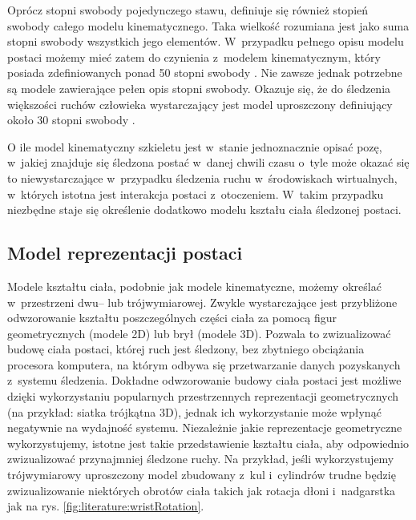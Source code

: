 Oprócz stopni swobody pojedynczego stawu, definiuje się również stopień swobody całego modelu kinematycznego. Taka wielkość rozumiana jest jako suma stopni swobody wszystkich jego elementów. W~przypadku pełnego opisu modelu postaci możemy mieć zatem do czynienia z~modelem kinematycznym, który posiada zdefiniowanych ponad 50 stopni swobody \cite{Agarwal2006}. Nie zawsze jednak potrzebne są modele zawierające pełen opis stopni swobody. Okazuje się, że do śledzenia większości ruchów człowieka wystarczający jest model uproszczony definiujący około 30 stopni swobody \cite{Sigal2006,Kwolek2011}.
													
O ile model kinematyczny szkieletu jest w~stanie jednoznacznie opisać pozę, w~jakiej znajduje się śledzona postać w~danej chwili czasu o~tyle może okazać się to niewystarczające w~przypadku śledzenia ruchu w~środowiskach wirtualnych, w~których istotna jest interakcja postaci z~otoczeniem. W~takim przypadku niezbędne staje się określenie dodatkowo modelu kształu ciała śledzonej postaci.
															
\subsection{Model reprezentacji postaci}
Modele kształtu ciała, podobnie jak modele kinematyczne, możemy określać w~przestrzeni dwu-- lub trójwymiarowej. Zwykle wystarczające jest przybliżone odwzorowanie kształtu poszczególnych części ciała za pomocą figur geometrycznych (modele 2D) lub brył (modele 3D). Pozwala to zwizualizować budowę ciała postaci, której ruch jest śledzony, bez zbytniego obciążania procesora komputera, na którym odbywa się przetwarzanie danych pozyskanych z~systemu śledzenia. Dokładne odwzorowanie budowy ciała postaci jest możliwe dzięki wykorzystaniu popularnych przestrzennych reprezentacji geometrycznych (na przykład: siatka trójkątna 3D), jednak ich wykorzystanie może wpłynąć negatywnie na wydajność systemu. 
Niezależnie jakie reprezentacje geometryczne wykorzystujemy, istotne jest takie przedstawienie kształtu ciała, aby odpowiednio zwizualizować przynajmniej śledzone ruchy. Na przykład, jeśli wykorzystujemy trójwymiarowy uproszczony model zbudowany z~kul i~cylindrów trudne będzię zwizualizowanie niektórych obrotów ciała takich jak rotacja dłoni i~nadgarstka jak na rys. \ref{fig:literature:wristRotation}.
															
